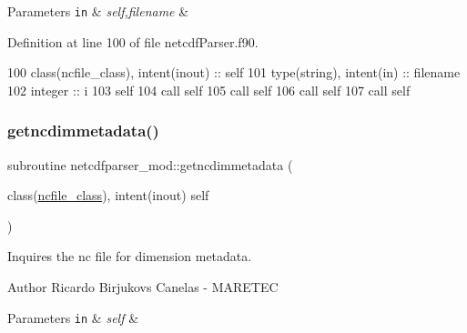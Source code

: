 \begin{DoxyParams}[1]{Parameters}
\mbox{\tt in}  & {\em self,filename} & \\
\hline
\end{DoxyParams}


Definition at line 100 of file netcdf\+Parser.\+f90.


\begin{DoxyCode}
100     \textcolor{keywordtype}{class}(ncfile\_class), \textcolor{keywordtype}{intent(inout)} :: self
101     \textcolor{keywordtype}{type}(string), \textcolor{keywordtype}{intent(in)} :: filename
102     \textcolor{keywordtype}{integer} :: i
103     self%
104     \textcolor{keyword}{call }self%
105     \textcolor{keyword}{call }self%
106     \textcolor{keyword}{call }self%
107     \textcolor{keyword}{call }self%
\end{DoxyCode}
\mbox{\label{namespacenetcdfparser__mod_a6354ee8b3c773cc7a5ad247ad1e34eeb}} 
\subsubsection{\texorpdfstring{getncdimmetadata()}{getncdimmetadata()}}
{\footnotesize\ttfamily subroutine netcdfparser\+\_\+mod\+::getncdimmetadata (\begin{DoxyParamCaption}\item[{class(\mbox{\hyperlink{structnetcdfparser__mod_1_1ncfile__class}{ncfile\+\_\+class}}), intent(inout)}]{self }\end{DoxyParamCaption})\hspace{0.3cm}{\ttfamily [private]}}



Inquires the nc file for dimension metadata. 

\begin{DoxyAuthor}{Author}
Ricardo Birjukovs Canelas -\/ M\+A\+R\+E\+T\+EC 
\end{DoxyAuthor}

\begin{DoxyParams}[1]{Parameters}
\mbox{\tt in}  & {\em self} & \\
\hline
\end{DoxyParams}


